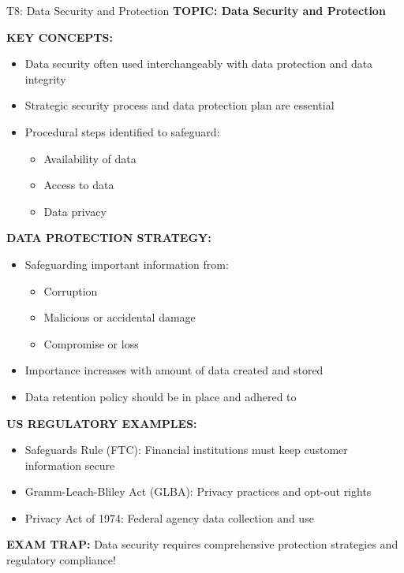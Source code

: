 \documentclass[8pt]{beamer}
\begin{document}
	\begin{frame}{T8: Data Security and Protection}
		\fontsize{6.5}{7.5}\selectfont
		\textbf{TOPIC: Data Security and Protection}
		
		\vspace{0.1cm}
		\textbf{KEY CONCEPTS:}
		\begin{itemize}
			\item Data security often used interchangeably with data protection and data integrity
			\item Strategic security process and data protection plan are essential
			\item Procedural steps identified to safeguard:
			\begin{itemize}
				\item Availability of data
				\item Access to data
				\item Data privacy
			\end{itemize}
		\end{itemize}
		
		\vspace{0.1cm}
		\textbf{DATA PROTECTION STRATEGY:}
		\begin{itemize}
			\item Safeguarding important information from:
			\begin{itemize}
				\item Corruption
				\item Malicious or accidental damage
				\item Compromise or loss
			\end{itemize}
			\item Importance increases with amount of data created and stored
			\item Data retention policy should be in place and adhered to
		\end{itemize}
		
		\vspace{0.1cm}
		\textbf{US REGULATORY EXAMPLES:}
		\begin{itemize}
			\item Safeguards Rule (FTC): Financial institutions must keep customer information secure
			\item Gramm-Leach-Bliley Act (GLBA): Privacy practices and opt-out rights
			\item Privacy Act of 1974: Federal agency data collection and use
		\end{itemize}
		
		\textcolor{myred}{\textbf{EXAM TRAP:}} Data security requires \textcolor{myblue}{comprehensive protection strategies and regulatory compliance}!
	\end{frame}
	
\end{document}
